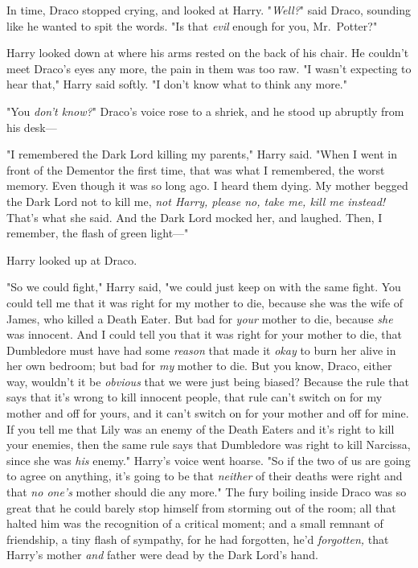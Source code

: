 In time, Draco stopped crying, and looked at Harry. "\emph{Well?}" said Draco,
sounding like he wanted to spit the words. "Is that \emph{evil} enough for you,
Mr.~Potter?"

Harry looked down at where his arms rested on the back of his chair. He
couldn't meet Draco's eyes any more, the pain in them was too raw. "I wasn't
expecting to hear that," Harry said softly. "I don't know what to think any
more."

"You \emph{don't know?}" Draco's voice rose to a shriek, and he stood up
abruptly from his desk---

"I remembered the Dark Lord killing my parents," Harry said. "When I went in
front of the Dementor the first time, that was what I remembered, the worst
memory. Even though it was so long ago. I heard them dying. My mother begged
the Dark Lord not to kill me, \emph{not Harry, please no, take me, kill me
instead!} That's what she said. And the Dark Lord mocked her, and laughed.
Then, I remember, the flash of green light\mbox{---}"

Harry looked up at Draco.

"So we could fight," Harry said, "we could just keep on with the same fight.
You could tell me that it was right for my mother to die, because she was the
wife of James, who killed a Death Eater. But bad for \emph{your} mother to die,
because \emph{she} was innocent. And I could tell you that it was right for
your mother to die, that Dumbledore must have had some \emph{reason} that made
it \emph{okay} to burn her alive in her own bedroom; but bad for \emph{my}
mother to die. But you know, Draco, either way, wouldn't it be \emph{obvious}
that we were just being biased? Because the rule that says that it's wrong to
kill innocent people, that rule can't switch on for my mother and off for
yours, and it can't switch on for your mother and off for mine. If you tell me
that Lily was an enemy of the Death Eaters and it's right to kill your enemies,
then the same rule says that Dumbledore was right to kill Narcissa, since she
was \emph{his} enemy." Harry's voice went hoarse. "So if the two of us are
going to agree on anything, it's going to be that \emph{neither} of their
deaths were right and that \emph{no one's} mother should die any more."
\sbreak
The fury boiling inside Draco was so great that he could barely stop himself
from storming out of the room; all that halted him was the recognition of a
critical moment; and a small remnant of friendship, a tiny flash of sympathy,
for he had forgotten, he'd \emph{forgotten,} that Harry's mother \emph{and}
father were dead by the Dark Lord's hand.

